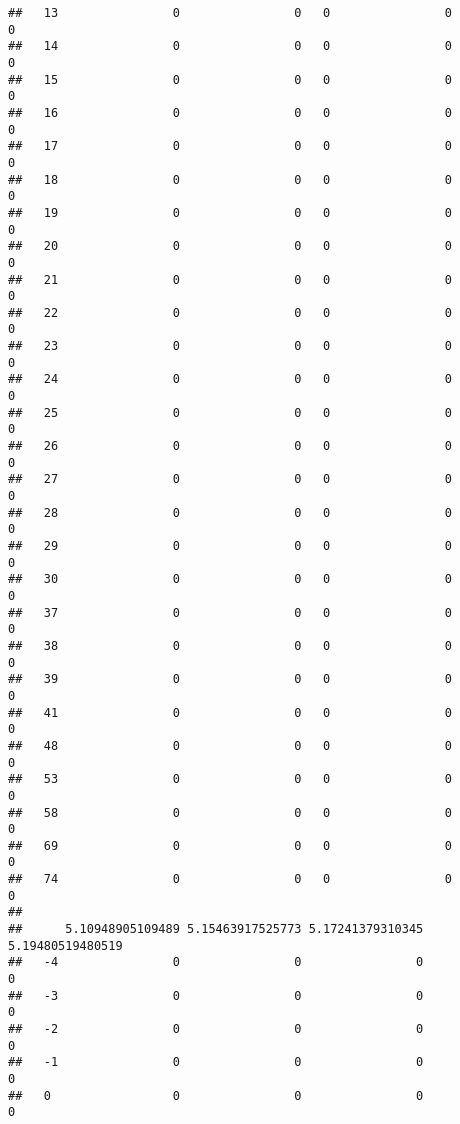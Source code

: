 \documentclass[]{article}
\begin{document}
\begin{verbatim}
##   13                0                0   0                0                0
##   14                0                0   0                0                0
##   15                0                0   0                0                0
##   16                0                0   0                0                0
##   17                0                0   0                0                0
##   18                0                0   0                0                0
##   19                0                0   0                0                0
##   20                0                0   0                0                0
##   21                0                0   0                0                0
##   22                0                0   0                0                0
##   23                0                0   0                0                0
##   24                0                0   0                0                0
##   25                0                0   0                0                0
##   26                0                0   0                0                0
##   27                0                0   0                0                0
##   28                0                0   0                0                0
##   29                0                0   0                0                0
##   30                0                0   0                0                0
##   37                0                0   0                0                0
##   38                0                0   0                0                0
##   39                0                0   0                0                0
##   41                0                0   0                0                0
##   48                0                0   0                0                0
##   53                0                0   0                0                0
##   58                0                0   0                0                0
##   69                0                0   0                0                0
##   74                0                0   0                0                0
##     
##      5.10948905109489 5.15463917525773 5.17241379310345 5.19480519480519
##   -4                0                0                0                0
##   -3                0                0                0                0
##   -2                0                0                0                0
##   -1                0                0                0                0
##   0                 0                0                0                0

\end{verbatim}
\end{document}
